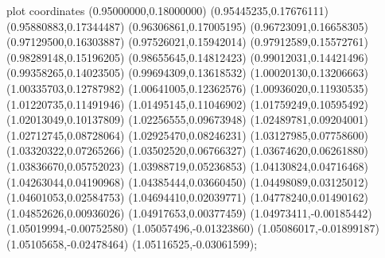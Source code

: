  plot coordinates {(0.95000000,0.18000000) (0.95445235,0.17676111) (0.95880883,0.17344487) (0.96306861,0.17005195) (0.96723091,0.16658305) (0.97129500,0.16303887) (0.97526021,0.15942014) (0.97912589,0.15572761) (0.98289148,0.15196205) (0.98655645,0.14812423) (0.99012031,0.14421496) (0.99358265,0.14023505) (0.99694309,0.13618532) (1.00020130,0.13206663) (1.00335703,0.12787982) (1.00641005,0.12362576) (1.00936020,0.11930535) (1.01220735,0.11491946) (1.01495145,0.11046902) (1.01759249,0.10595492) (1.02013049,0.10137809) (1.02256555,0.09673948) (1.02489781,0.09204001) (1.02712745,0.08728064) (1.02925470,0.08246231) (1.03127985,0.07758600) (1.03320322,0.07265266) (1.03502520,0.06766327) (1.03674620,0.06261880) (1.03836670,0.05752023) (1.03988719,0.05236853) (1.04130824,0.04716468) (1.04263044,0.04190968) (1.04385444,0.03660450) (1.04498089,0.03125012) (1.04601053,0.02584753) (1.04694410,0.02039771) (1.04778240,0.01490162) (1.04852626,0.00936026) (1.04917653,0.00377459) (1.04973411,-0.00185442) (1.05019994,-0.00752580) (1.05057496,-0.01323860) (1.05086017,-0.01899187) (1.05105658,-0.02478464) (1.05116525,-0.03061599)};
